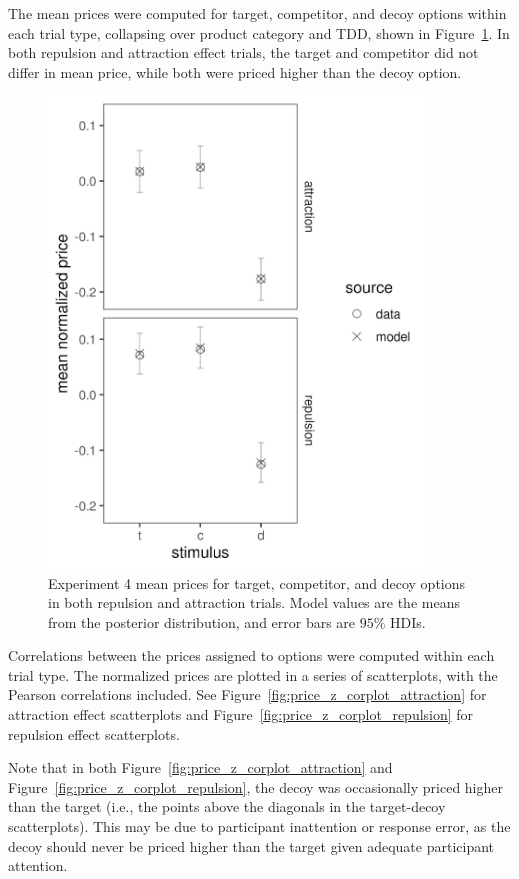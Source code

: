 The mean prices were computed for target, competitor, and decoy options within each trial type, collapsing over product category and TDD, shown in Figure~\ref{fig:price_mu_model_data}. In both repulsion and attraction effect trials, the target and competitor did not differ in mean price, while both were priced higher than the decoy option.

\begin{figure}
    \centering
    \includegraphics[scale=0.5, width=100mm]{figures/pricing_mu_model_data.jpeg}
    \caption{Experiment 4 mean prices for target, competitor, and decoy options in both repulsion and attraction trials. Model values are the means from the posterior distribution, and error bars are $95\%$ HDIs.}
    \label{fig:price_mu_model_data}
\end{figure}

Correlations between the prices assigned to options were computed within each trial type. The normalized prices are plotted in a series of scatterplots, with the Pearson correlations included. See Figure~\ref{fig:price_z_corplot_attraction} for attraction effect scatterplots and Figure~\ref{fig:price_z_corplot_repulsion} for repulsion effect scatterplots.

Note that in both Figure~\ref{fig:price_z_corplot_attraction} and Figure~\ref{fig:price_z_corplot_repulsion}, the decoy was occasionally priced higher than the target (i.e., the points above the diagonals in the target-decoy scatterplots). This may be due to participant inattention or response error, as the decoy should never be priced higher than the target given adequate participant attention. 

